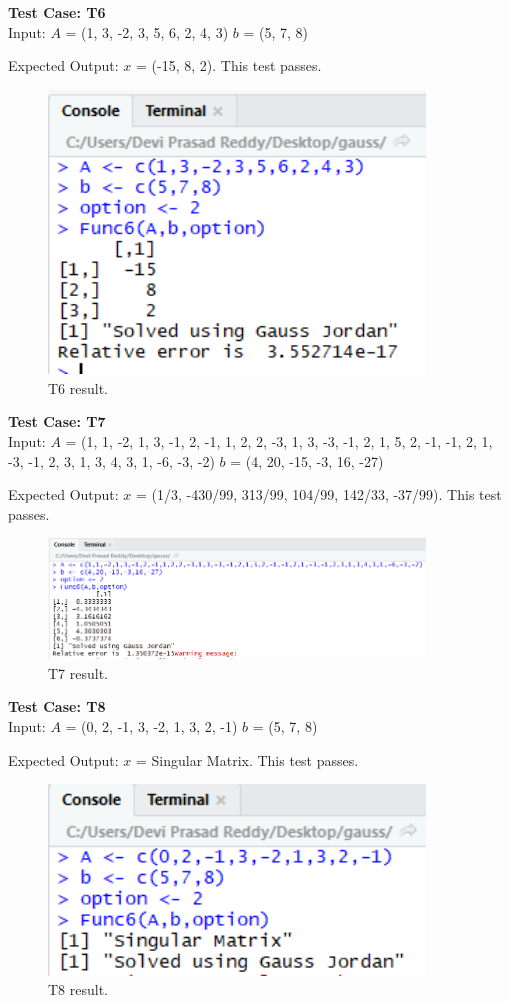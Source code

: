 \documentclass[12pt, titlepage]{article}
\begin{document}
\textbf{Test Case: T6}\\

Input: $A$ = (1, 3, -2, 3, 5, 6, 2, 4, 3)
$b$ = (5, 7, 8)

Expected Output: $x$ = (-15, 8, 2). This test passes.

\begin{figure}[H]
\centering
 \includegraphics[width=100mm]{T6}
  \caption{T6 result.}
  \label{fig:T6}
\end{figure}

\textbf{Test Case: T7}\\

Input: $A$ = (1, 1, -2, 1, 3, -1, 2, -1, 1, 2, 2, -3, 1, 3, -3, -1, 2, 1, 5, 2, -1, -1, 2, 1, -3, -1, 2, 3, 1, 3, 4, 3, 1, -6, -3, -2)
$b$ = (4, 20, -15, -3, 16, -27)

Expected Output: $x$ = (1/3, -430/99, 313/99, 104/99, 142/33, -37/99). This test passes.

\begin{figure}[H]
\centering
 \includegraphics[width=100mm]{T7}
  \caption{T7 result.}
  \label{fig:T7}
\end{figure}

\textbf{Test Case: T8}\\

Input: $A$ = (0, 2, -1, 3, -2, 1, 3, 2, -1)
$b$ = (5, 7, 8)

Expected Output: $x$ = Singular Matrix. This test passes.

\begin{figure}[H]
\centering
 \includegraphics[width=100mm]{T8}
  \caption{T8 result.}
  \label{fig:T8}
\end{figure}
\end{document}
